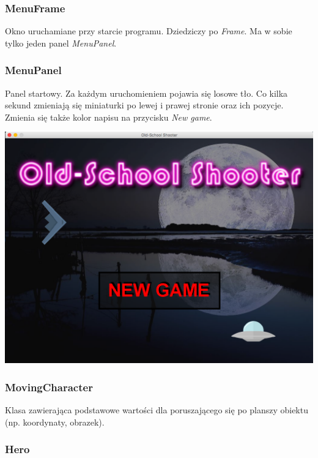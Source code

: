 \documentclass[a4paper,10pt]{article}
\begin{document}
\subsubsection{MenuFrame}

Okno uruchamiane przy starcie programu. Dziedziczy po \textit{Frame}. Ma w sobie tylko jeden panel \textit{MenuPanel}.

\subsubsection{MenuPanel}

Panel startowy. Za każdym uruchomieniem pojawia się losowe tło. Co kilka sekund zmieniają się miniaturki po lewej i prawej stronie oraz ich pozycje. Zmienia się także kolor napisu na przycisku \textit{New game}.

\begin{center}
\includegraphics[scale=0.18]{menu.png}
\end{center}

\subsubsection{MovingCharacter}

Klasa zawierająca podstawowe wartości dla poruszającego się po planszy obiektu (np. koordynaty, obrazek).

\subsubsection{Hero}
\end{document}
